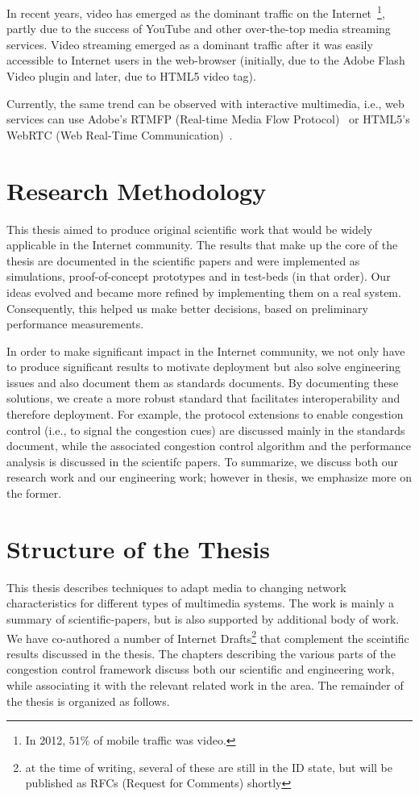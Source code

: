 In recent years, video has emerged as the dominant traffic on the
Internet~\cite{cvni.13,dawn.zb}\footnote{In 2012, $51\%$ of mobile traffic was
video.}, partly due to the success of YouTube and other over-the-top media
streaming services. Video streaming emerged as a dominant traffic after it was
easily accessible to Internet users in the web-browser (initially, due to the
Adobe Flash Video plugin and later, due to HTML5 video tag).

Currently, the same trend can be observed with interactive multimedia, i.e.,
web services can use Adobe's RTMFP (Real-time Media Flow
Protocol)~\cite{draft.rtmfp} or HTML5's WebRTC (Web Real-Time
Communication)~\cite{draft.webrtc}. 


\section{Research Methodology}

This thesis aimed to produce original scientific work that would be widely
applicable in the Internet community. The results that make up the core of the
thesis are documented in the scientific papers and were implemented as
simulations, proof-of-concept prototypes and in test-beds (in that order). Our
ideas evolved and became more refined by implementing them on a real system.
Consequently, this helped us make better decisions, based on preliminary
performance measurements.

In order to make significant impact in the Internet community, we not only
have to produce significant results to motivate deployment but also solve
engineering issues and also document them as standards documents. By
documenting these solutions, we create a more robust standard that facilitates
interoperability and therefore deployment. For example, the protocol
extensions to enable congestion control (i.e., to signal the congestion cues)
are discussed mainly in the standards document, while the associated
congestion control algorithm and the performance analysis is discussed in the
scientifc papers. To summarize, we discuss both our research work and our
engineering work; however in thesis, we emphasize more on the former.



\section{Structure of the Thesis}

This thesis describes techniques to adapt media to changing network
characteristics for different types of multimedia systems. The work is mainly
a summary of scientific-papers, but is also supported by additional body of
work. We have co-authored a number of Internet Drafts\footnote{at the time of
writing, several of these are still in the ID state, but will be published as
RFCs (Request for Comments) shortly} that complement the  sceintific results
discussed in the thesis. The chapters describing the various parts of the
congestion control framework discuss both our scientific and engineering work,
while associating it with the relevant related work in the area. The remainder
of the thesis is organized as follows.

